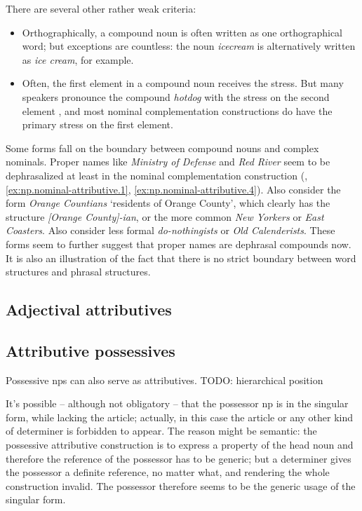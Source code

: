 \documentclass[UTF8, a4paper, oneside, scheme=plain, 12pt]{ctexbook}
\newcommand*{\citepage}[1]{p.~{#1}}
\newcommand{\form}[1]{\emph{#1}}
\newcommand{\translate}[1]{`#1'}
\begin{document}
There are several other rather weak criteria: 
\begin{itemize}
    \item Orthographically, a compound noun is often written as one orthographical word; 
        but exceptions are countless: 
        the noun \form{icecream} is alternatively written as \form{ice cream}, for example. 
    \item Often, the first element in a compound noun receives the stress.  
        But many speakers pronounce the compound \form{hotdog} 
        with the stress on the second element 
        \citep[\citepage{451}]{cgel}, 
        and most nominal complementation constructions do have the primary stress 
        on the first element.  
\end{itemize}
 
Some forms fall on the boundary between 
compound nouns and complex nominals.
Proper names like \form{Ministry of Defense} 
and \form{Red River} seem to be dephrasalized
at least in the nominal complementation construction
(, 
\ref{ex:np.nominal-attributive.1}, \ref{ex:np.nominal-attributive.4}). 
Also consider the form \form{Orange Countians} \translate{residents of Orange County},
which clearly has the structure \form{[Orange County]-ian},
or the more common \form{New Yorkers} or \form{East Coasters}.
Also consider less formal \form{do-nothingists} or \form{Old Calenderists}.
These forms seem to further suggest that proper names are dephrasal compounds now.
It is also an illustration of the fact that there is no strict boundary between
word structures and phrasal structures.

\subsection{Adjectival attributives}

\subsection{Attributive possessives}

Possessive \acs{np}s can also serve as attributives. TODO: hierarchical position 
\citep[\citepage{469}]{cgel}

It's possible -- although not obligatory -- 
that the possessor \acs{np} is in the singular form,
while lacking the article; 
actually, in this case the article or any other kind of determiner 
is forbidden to appear. 
The reason might be semantic: 
the possessive attributive construction 
is to express a property of the head noun 
and therefore the reference of the possessor has to be generic; 
but a determiner gives the possessor a definite reference, no matter what, 
and rendering the whole construction invalid. 
The possessor therefore seems to be the generic usage of the singular form.
\end{document}
